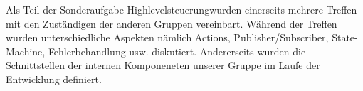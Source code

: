 Als Teil der Sonderaufgabe \glqq Highlevelsteuerung\grqq wurden einerseits mehrere Treffen mit den Zuständigen der anderen Gruppen vereinbart. Während der Treffen wurden unterschiedliche Aspekten nämlich Actions, Publisher/Subscriber, State-Machine, Fehlerbehandlung usw. diskutiert. Andererseits wurden die Schnittstellen der internen Komponeneten unserer Gruppe im Laufe der Entwicklung definiert.